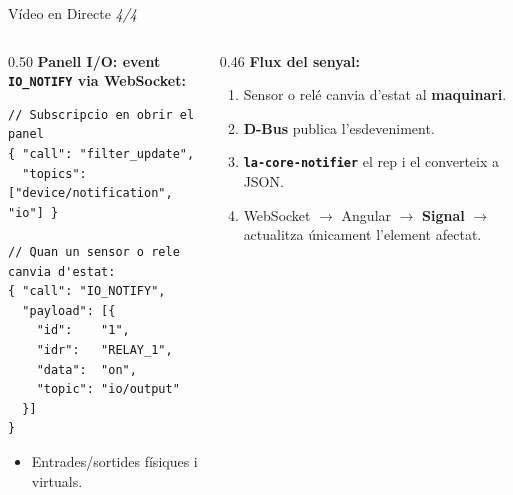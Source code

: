 \begin{frame}[fragile]{Vídeo en Directe \small\textit{4/4}}
  \begin{columns}[T]
    \begin{column}{0.50\textwidth}
      \small\textbf{Panell I/O: event \texttt{IO\_NOTIFY} via WebSocket:}
      \vspace{0.3em}

      \begin{lstlisting}[style=jsonbox]
// Subscripcio en obrir el panel
{ "call": "filter_update",
  "topics": ["device/notification", "io"] }

// Quan un sensor o rele canvia d'estat:
{ "call": "IO_NOTIFY",
  "payload": [{
    "id":    "1",
    "idr":   "RELAY_1",
    "data":  "on",
    "topic": "io/output"
  }]
} \end{lstlisting}

      \begin{itemize}
        \item Entrades/sortides físiques i virtuals.
      \end{itemize}
    \end{column}

    \begin{column}{0.46\textwidth}
      \vspace{0.5em}
      \small\textbf{Flux del senyal:}
      \begin{enumerate}
        \item Sensor o relé canvia d'estat al \textbf{maquinari}.
        \item \textbf{D-Bus} publica l'esdeveniment.
        \item \textbf{\texttt{la-core-notifier}} el rep i el converteix a JSON.
        \item WebSocket $\to$ Angular $\to$ \textbf{Signal} $\to$ actualitza únicament l'element afectat.
      \end{enumerate}
    \end{column}
  \end{columns}
\end{frame}


